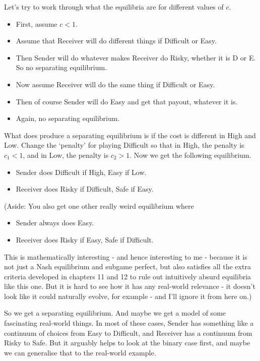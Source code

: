 \documentclass[11pt,]{article}
\providecommand{\tightlist}{%
  \setlength{\itemsep}{0pt}\setlength{\parskip}{0pt}}
\begin{document}
Let's try to work through what the equilibria are for different values
of \(c\).

\begin{itemize}
\tightlist
\item
  First, assume \(c < 1\).
\item
  Assume that Receiver will do different things if Difficult or Easy.
\item
  Then Sender will do whatever makes Receiver do Risky, whether it is D
  or E. So no separating equilibrium.
\item
  Now assume Receiver will do the same thing if Difficult or Easy.
\item
  Then of course Sender will do Easy and get that payout, whatever it
  is.
\item
  Again, no separating equilibrium.
\end{itemize}

\newpage

What does produce a separating equilibrium is if the cost is different
in High and Low. Change the `penalty' for playing Difficult so that in
High, the penalty is \(c_1 < 1\), and in Low, the penalty is
\(c_2 > 1\). Now we get the following equilibrium.

\begin{itemize}
\tightlist
\item
  Sender does Difficult if High, Easy if Low.
\item
  Receiver does Risky if Difficult, Safe if Easy.
\end{itemize}

(Aside: You also get one other really weird equilibrium where

\begin{itemize}
\tightlist
\item
  Sender always does Easy.
\item
  Receiver does Risky if Easy, Safe if Difficult.
\end{itemize}

This is mathematically interesting - and hence interesting to me -
because it is not just a Nash equilibrium and subgame perfect, but also
satisfies all the extra criteria developed in chapters 11 and 12 to rule
out intuitively absurd equilibria like this one. But it is hard to see
how it has any real-world relevance - it doesn't look like it could
naturally evolve, for example - and I'll ignore it from here on.)

So we get a separating equilibrium. And maybe we get a model of some
fascinating real-world things. In most of these cases, Sender has
something like a continuum of choices from Easy to Difficult, and
Receiver has a continuum from Risky to Safe. But it arguably helps to
look at the binary case first, and maybe we can generalise that to the
real-world example.
\end{document}
